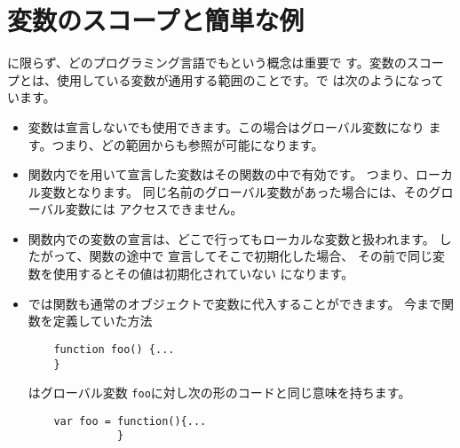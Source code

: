 \section{変数のスコープと簡単な例}
\JS に限らず、どのプログラミング言語でもという概念は重要で
す。変数のスコープとは、使用している変数が通用する範囲のことです。\JS で
は次のようになっています。
\begin{itemize}
 \item 変数は宣言しないでも使用できます。この場合はグローバル変数になり
       ます。つまり、どの範囲からも参照が可能になります。
 \item 関数内でを用いて宣言した変数はその関数の中で有効です。
       つまり、ローカル変数となります。
       同じ名前のグローバル変数があった場合には、そのグローバル変数には
       アクセスできません。
 \item 関数内での変数の宣言は、どこで行ってもローカルな変数と扱われます。
			 したがって、関数の途中で 宣言してそこで初期化した場合、
			 その前で同じ変数を使用するとその値は初期化されていない
			 になります。
 \item \JS では関数も通常のオブジェクトで変数に代入することができます。
       今まで関数を定義していた方法
\begin{Verbatim}
	function foo() {...
	}
\end{Verbatim}
はグローバル変数 \texttt{foo}に対し次の形のコードと同じ意味を持ちます。
\begin{Verbatim}
	var foo = function(){...
	          }
\end{Verbatim}
\end{itemize}

